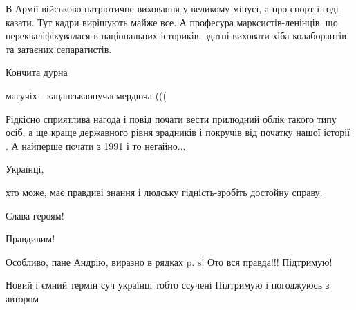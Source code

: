 \begin{itemize}
В Армії військово-патріотичне виховання у великому мінусі, а про спорт і годі
казати. Тут кадри вирішують майже все. А професура марксистів-ленінців, що
перекваліфікувалася в національних істориків, здатні виховати хіба колаборантів
та затаєних сепаратистів.

 
Кончита дурна

 
магучіх - кацапськаонучасмердюча (((

 

Рідкісно сприятлива нагода і повід почати вести прилюдний облік такого типу
осіб, а ще краще державного рівня зрадників і покручів від початку нашої
історії . А найперше почати з 1991 і то негайно...

Українці,

хто може, має правдиві знання і людську гідність-зробіть достойну справу.

Слава героям!

Правдивим!

 
Особливо, пане Андрію, виразно в рядках p. s! Ото вся правда!!! Підтримую!

 
Новий і ємний термін суч українці тобто ссучені
Підтримую і погоджуюсь з автором


\end{itemize}
